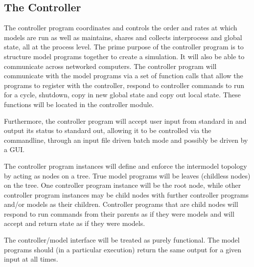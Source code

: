 \documentclass{book}
\begin{document}
\subsection{The Controller}
The controller program coordinates and controls the order and rates at which models are run as well as maintains, shares and collects interprocess and global state, all at the process level. The prime purpose of the controller program is to structure model programs together to create a simulation. It will also be able to communicate across networked computers. The controller program will communicate with the model programs via a set of function  calls that allow the programs to register with the controller, respond to controller commands to run for a cycle, shutdown, copy in new global state and copy out local state. These functions will be located in the controller module.

Furthermore, the controller program will accept user input from standard in and output its status to standard out, allowing it to be controlled via the commandline, through an input file driven batch mode and possibly be driven by a GUI.

The controller program instances will define and enforce the intermodel topology by acting as nodes on a tree.  True model programs will be leaves (childless nodes) on the tree. One controller program instance will be the root node, while other controller program instances may be child nodes with further controller programs and/or models as their children. Controller programs that are child nodes will respond to run commands from their parents as if they were models and will accept and return state as if they were models.

The controller/model interface will be treated as purely functional. The model programs should (in a particular execution) return the same output for a given input at all times. 
\end{document}

